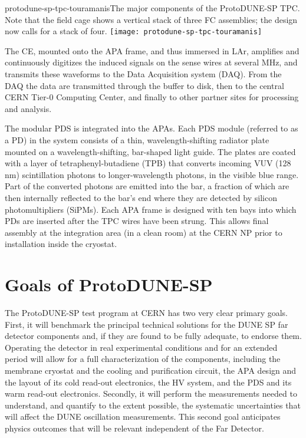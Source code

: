 \begin{cdrfigure}{protodune-sp-tpc-touramanis}{The major components of the ProtoDUNE-SP TPC. Note that the field cage shows a vertical stack of three FC assemblies; the design now calls for a stack of four.}
\texttt{[image: protodune-sp-tpc-touramanis]}
\end{cdrfigure}

The CE, mounted onto the APA frame, and thus immersed in LAr, amplifies and continuously digitizes the induced signals on the sense wires at several MHz, and transmits these waveforms to the Data Acquisition system (DAQ). From the DAQ the data are  transmitted through the buffer to disk, then to the central CERN Tier-0 Computing Center, and finally to other partner sites for processing and analysis.  

The modular PDS is integrated into the APAs. Each PDS module (referred to as a PD) in the system consists of a thin, wavelength-shifting radiator plate mounted on a wavelength-shifting, bar-shaped light guide. The plates are coated with a
layer of tetraphenyl-butadiene (TPB) that converts incoming VUV (128 nm) 
scintillation photons to longer-wavelength photons, in the visible blue range. Part of the converted photons are emitted into the bar, a fraction of which are then internally reflected to the bar's end where they are detected by silicon photomultipliers (SiPMs).
Each APA frame is designed with ten bays into which PDs are inserted after the TPC wires have been strung. This  allows final assembly at the integration area (in a clean room) at the CERN NP prior to installation inside the cryostat. 


\section{Goals of ProtoDUNE-SP}
\label{intro:goals}

The ProtoDUNE-SP test program at CERN has two very clear primary goals. First, it will benchmark the principal technical solutions for the DUNE SP far detector components and, if they are found to be fully adequate, to endorse them. 
Operating the detector in real experimental conditions and for an extended period will allow for a full characterization of the components, including the membrane cryostat and the cooling and purification circuit, the APA design and the layout of its cold read-out electronics, the HV system, and the PDS and its warm read-out electronics.
%
Secondly, it will perform the measurements needed to understand, and quantify to the extent possible, the systematic uncertainties that will affect the DUNE oscillation measurements. This second goal anticipates physics outcomes that will be relevant independent of the Far Detector.

